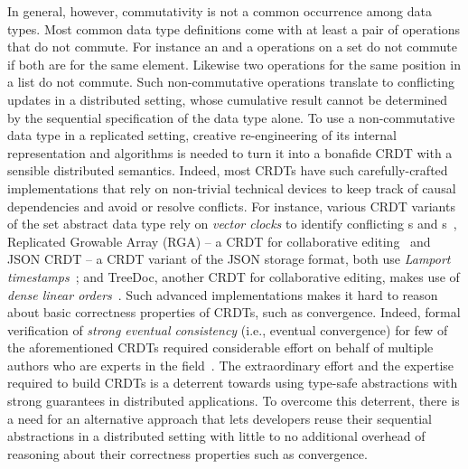 In general, however, commutativity is not a common occurrence among
data types. Most common data type definitions come with at least a
pair of operations that do not commute. For instance an  and a
 operations on a set do not commute if both are for the same
element.  Likewise two  operations for the same position in
a list do not commute. Such non-commutative operations translate to
conflicting updates in a distributed setting, whose cumulative result
cannot be determined by the sequential specification of the data type
alone. To use a non-commutative data type in a replicated setting,
creative re-engineering of its internal representation and algorithms
is needed to turn it into a bonafide CRDT with a sensible distributed
semantics.
Indeed, most CRDTs have such carefully-crafted implementations that
rely on non-trivial technical devices to keep track of causal
dependencies and avoid or resolve conflicts. For instance, various
CRDT variants of the set abstract data type rely on \emph{vector
clocks} to identify conflicting s and
s~\cite{zawirski-thesis, zhang}, Replicated Growable Array
(RGA) -- a CRDT for collaborative editing~\cite{rga} and JSON CRDT --
a CRDT variant of the JSON storage format, both use \emph{Lamport
timestamps}~\cite{rga, json-crdt}; and TreeDoc, another CRDT for
collaborative editing, makes use of \emph{dense linear
orders}~\cite{treedoc}. Such advanced implementations makes it hard to
reason about basic correctness properties of CRDTs, such as
convergence. Indeed, formal verification of \emph{strong eventual
consistency} (i.e., eventual convergence) for few of the
aforementioned CRDTs required considerable effort on behalf of
multiple authors who are experts in the field~\cite{kleppmann2017}.
The extraordinary effort and the expertise required to build CRDTs is
a deterrent towards using type-safe abstractions with strong
guarantees in distributed applications. To overcome this deterrent,
there is a need for an alternative approach that lets developers reuse
their sequential abstractions in a distributed setting with little to
no additional overhead of reasoning about their correctness properties
such as convergence.


